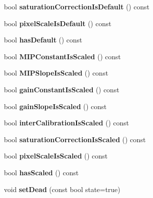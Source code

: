 \begin{DoxyCompactItemize}
\item 
bool {\bfseries saturationCorrectionIsDefault} () const \label{classCALICE_1_1SiPMCalibrationStatusBits_ad2d4257f2d6692847108397fa5ffc098}

\item 
bool {\bfseries pixelScaleIsDefault} () const \label{classCALICE_1_1SiPMCalibrationStatusBits_aa8829af954fcb9b5b3c3a35d4bb02321}

\item 
bool {\bfseries hasDefault} () const \label{classCALICE_1_1SiPMCalibrationStatusBits_ab2c1f6202330a29d229b30ddf740e23a}

\item 
bool {\bfseries MIPConstantIsScaled} () const \label{classCALICE_1_1SiPMCalibrationStatusBits_a2c0d200fc62a7d19afc974fffaac0bbd}

\item 
bool {\bfseries MIPSlopeIsScaled} () const \label{classCALICE_1_1SiPMCalibrationStatusBits_a0bc64339f62fdd7034d12fbcc1bf10f0}

\item 
bool {\bfseries gainConstantIsScaled} () const \label{classCALICE_1_1SiPMCalibrationStatusBits_a67ee173322903b66ab028315fc1b0e3d}

\item 
bool {\bfseries gainSlopeIsScaled} () const \label{classCALICE_1_1SiPMCalibrationStatusBits_a29717fb78eda7c911e5e1c6c99bce398}

\item 
bool {\bfseries interCalibrationIsScaled} () const \label{classCALICE_1_1SiPMCalibrationStatusBits_a4667a09baf873f55145fbabebcb17ce9}

\item 
bool {\bfseries saturationCorrectionIsScaled} () const \label{classCALICE_1_1SiPMCalibrationStatusBits_a09521e16e0877d280ef1a3d728aac8c2}

\item 
bool {\bfseries pixelScaleIsScaled} () const \label{classCALICE_1_1SiPMCalibrationStatusBits_a531f616b398de3198c98c8ed8d51c235}

\item 
bool {\bfseries hasScaled} () const \label{classCALICE_1_1SiPMCalibrationStatusBits_a35d0873f53f47f39e3281b3b36a4e511}

\item 
void {\bfseries setDead} (const bool state=true)\label{classCALICE_1_1SiPMCalibrationStatusBits_a6b2cde5c02bf673bab596b5e679d8400}


\end{DoxyCompactItemize}

